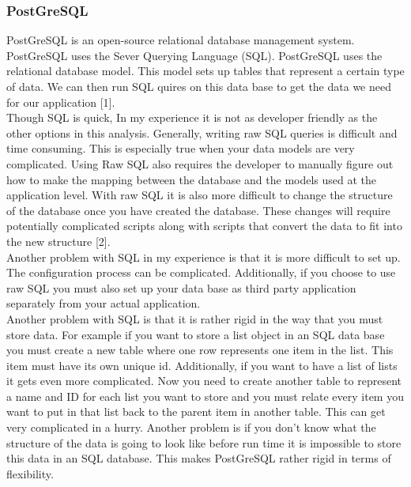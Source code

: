\documentclass[onecolumn, draftclsnofoot,10pt, compsoc]{article}
\begin{document}
		\subsubsection{PostGreSQL}
				PostGreSQL is an open-source relational database management system. PostGreSQL uses the Sever Querying Language (SQL). PostGreSQL uses the relational database model. This model sets up tables that represent a certain type of data. We can then run SQL quires on this data base to get the data we need for our application [1].\\
				Though SQL is quick, In my experience it is not as developer friendly as the other options in this analysis. Generally, writing raw SQL queries is difficult and time consuming. This is especially true when your data models are very complicated. Using Raw SQL also requires the developer to manually figure out how to make the mapping between the database and the models used at the application level. With raw SQL it is also more difficult to change the structure of the database once you have created the database. These changes will require potentially complicated scripts along with scripts that convert the data to fit into the new structure [2].\\
				Another problem with SQL in my experience is that it is more difficult to set up. The configuration process can be complicated. Additionally, if you choose to use raw SQL you must also set up your data base as third party application separately from your actual application.\\
				Another problem with SQL is that it is rather rigid in the way that you must store data. For example if you want to store a list object in an SQL data base you must create a new table where one row represents one item in the list. This item must have its own unique id. Additionally, if you want to have a list of lists it gets even more complicated. Now you need to create another table to represent a name and ID for each list you want to store and you must relate every item you want to put in that list back to the parent item in another table. This can get very complicated in a hurry. Another problem is if you don't know what the structure of the data is going to look like before run time it is impossible to store this data in an SQL database. This makes PostGreSQL rather rigid in terms of flexibility.\\
\end{document}
